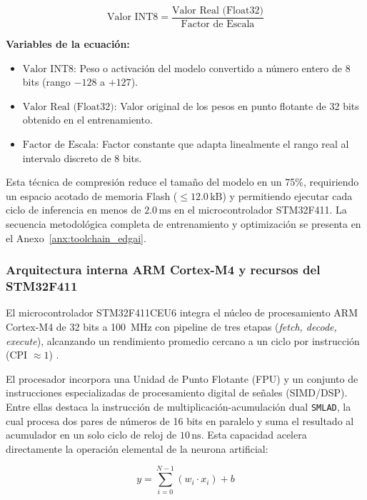 \begin{equation}
\text{Valor INT8} = \frac{\text{Valor Real (Float32)}}{\text{Factor de Escala}}
\label{eq:cuantizacion_int8}
\end{equation}

\noindent\textbf{Variables de la ecuación:}
\begin{itemize}
    \item $\text{Valor INT8}$: Peso o activación del modelo convertido a número entero de 8 bits (rango $-128$ a $+127$).
    \item $\text{Valor Real (Float32)}$: Valor original de los pesos en punto flotante de 32 bits obtenido en el entrenamiento.
    \item $\text{Factor de Escala}$: Factor constante que adapta linealmente el rango real al intervalo discreto de 8 bits.
\end{itemize}

Esta técnica de compresión reduce el tamaño del modelo en un 75\%, requiriendo un espacio acotado de memoria Flash ($\le 12.0\,\text{kB}$) y permitiendo ejecutar cada ciclo de inferencia en menos de $2.0\,\text{ms}$ en el microcontrolador STM32F411. La secuencia metodológica completa de entrenamiento y optimización se presenta en el Anexo~\ref{anx:toolchain_edgai}.


\subsubsection{Arquitectura interna ARM Cortex-M4 y recursos del STM32F411}

El microcontrolador STM32F411CEU6 integra el núcleo de procesamiento ARM Cortex-M4 de 32 bits a 100~MHz con pipeline de tres etapas (\textit{fetch, decode, execute}), alcanzando un rendimiento promedio cercano a un ciclo por instrucción (CPI $\approx 1$) \citep{warden2019}.

El procesador incorpora una Unidad de Punto Flotante (FPU) y un conjunto de instrucciones especializadas de procesamiento digital de señales (SIMD/DSP). Entre ellas destaca la instrucción de multiplicación-acumulación dual \texttt{SMLAD}, la cual procesa dos pares de números de 16 bits en paralelo y suma el resultado al acumulador en un solo ciclo de reloj de $10\,\text{ns}$. Esta capacidad acelera directamente la operación elemental de la neurona artificial:

\begin{equation}
y = \sum_{i=0}^{N-1} (w_i \cdot x_i) + b
\label{eq:mac_neurona}
\end{equation}

